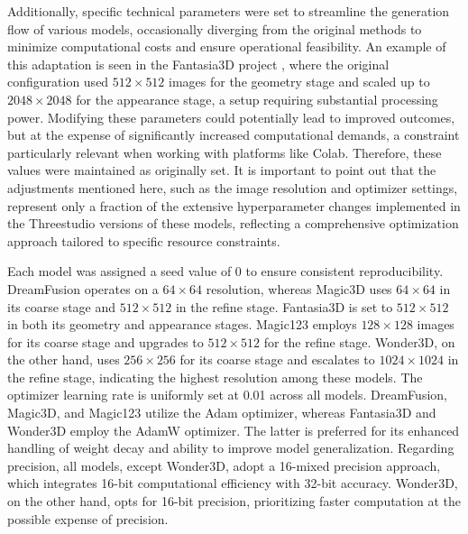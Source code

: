Additionally, specific technical parameters were set to streamline the generation flow of various models, occasionally diverging from the original methods to minimize computational costs and ensure operational feasibility. An example of this adaptation is seen in the Fantasia3D project \citep{chen2023fantasia3d}, where the original configuration used \(512\times512\) images for the geometry stage and scaled up to \(2048\times2048\) for the appearance stage, a setup requiring substantial processing power. Modifying these parameters could potentially lead to improved outcomes, but at the expense of significantly increased computational demands, a constraint particularly relevant when working with platforms like Colab. Therefore, these values were maintained as originally set. It is important to point out that the adjustments mentioned here, such as the image resolution and optimizer settings, represent only a fraction of the extensive hyperparameter changes implemented in the Threestudio versions of these models, reflecting a comprehensive optimization approach tailored to specific resource constraints.

Each model was assigned a seed value of 0 to ensure consistent reproducibility. DreamFusion operates on a \(64\times64\) resolution, whereas Magic3D uses \(64\times64\) in its coarse stage and \(512\times512\) in the refine stage. Fantasia3D is set to \(512\times512\) in both its geometry and appearance stages. Magic123 employs \(128\times128\) images for its coarse stage and upgrades to \(512\times512\) for the refine stage. Wonder3D, on the other hand, uses \(256\times256\) for its coarse stage and escalates to \(1024\times1024\) in the refine stage, indicating the highest resolution among these models. The optimizer learning rate is uniformly set at 0.01 across all models. DreamFusion, Magic3D, and Magic123 utilize the Adam optimizer, whereas Fantasia3D and Wonder3D employ the AdamW optimizer. The latter is preferred for its enhanced handling of weight decay and ability to improve model generalization. Regarding precision, all models, except Wonder3D, adopt a 16-mixed precision approach, which integrates 16-bit computational efficiency with 32-bit accuracy. Wonder3D, on the other hand, opts for 16-bit precision, prioritizing faster computation at the possible expense of precision.